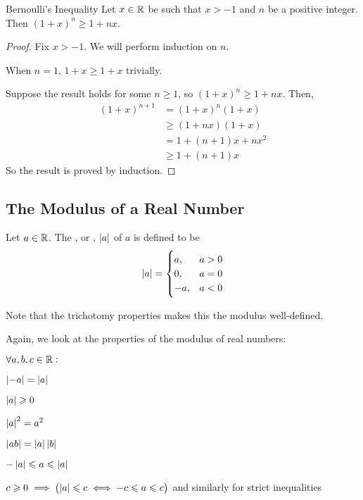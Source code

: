 \documentclass{styles/tufte}
\begin{document}
    \begin{theorem}{Bernoulli's Inequality}{}
      Let $x \in \mathbb{R}$ be such that $x > -1$ and $n$ be a positive integer. Then $(1 + x)^n \geqslant 1 + nx$.
    \end{theorem}
    \begin{proof}
      Fix $x > -1$. We will perform induction on $n$.
      
      When $n = 1$, $1 + x \geqslant 1 + x$ trivially.
      
      Suppose the result holds for some $n \geqslant 1$, so $(1 + x)^n \geqslant 1 + nx$. Then,
      \begin{align*}
        (1 + x)^{n+1} &= (1 + x)^n (1 + x) \\
        &\geqslant (1 + nx) (1 + x) \\
        &= 1 + (n + 1)x + nx^2 \\
        &\geqslant 1 + (n + 1)x
      \end{align*}
      So the result is proved by induction.
    \end{proof}
  
  
  \subsection{The Modulus of a Real Number}
    
    \begin{definition}{}{}
      Let $a \in \mathbb{R}$. The , or , $\abs{a}$ of $a$ is defined to be
      \[ \abs{a} = \begin{cases}
        a, & a > 0 \\
        0, & a = 0 \\
        -a, & a < 0
      \end{cases} \]
    \end{definition}
    
    Note that the trichotomy properties makes this the modulus well-defined.
    
    Again, we look at the properties of the modulus of real numbers:
    \begin{proposition}{}{}
      $\forall a, b, c \in \mathbb{R} :$
      \begin{romanenum}
        \item $\abs{-a} = \abs{a}$
        \item $\abs{a} \geqslant 0$
        \item $\abs{a}^2 = a^2$
        \item $\abs{ab} = \abs{a} \abs{b}$
        \item $-\abs{a} \leqslant a \leqslant \abs{a}$
        \item $c \geqslant 0 \implies \left(\abs{a} \leqslant c \iff -c \leqslant a \leqslant c\right)$ and similarly for strict inequalities
      \end{romanenum}
    \end{proposition}
    
\end{document}
